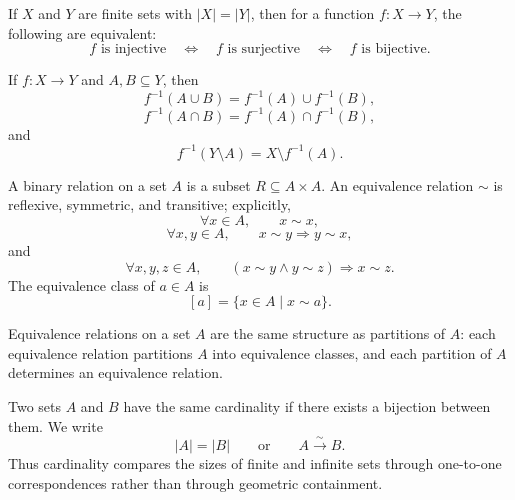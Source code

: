     \begin{proposition}
        If $X$ and $Y$ are finite sets with $|X|=|Y|$, then for a function
        $f:X\to Y$, the following are equivalent:
        \[
            f\text{ is injective}
            \quad\Longleftrightarrow\quad
            f\text{ is surjective}
            \quad\Longleftrightarrow\quad
            f\text{ is bijective}.
        \]
    \end{proposition}

    \begin{proposition}
        If $f:X\to Y$ and $A,B\subseteq Y$, then
        \[
            f^{-1}(A\cup B)=f^{-1}(A)\cup f^{-1}(B),
        \]
        \[
            f^{-1}(A\cap B)=f^{-1}(A)\cap f^{-1}(B),
        \]
        and
        \[
            f^{-1}(Y\setminus A)=X\setminus f^{-1}(A).
        \]
    \end{proposition}

    \begin{definition}
        A binary relation on a set $A$ is a subset $R\subseteq A\times A$.
        An equivalence relation $\sim$ is reflexive, symmetric, and transitive;
        explicitly,
        \[
            \forall x\in A,
            \qquad x\sim x,
        \]
        \[
            \forall x,y\in A,
            \qquad x\sim y\Rightarrow y\sim x,
        \]
        and
        \[
            \forall x,y,z\in A,
            \qquad
            (x\sim y\land y\sim z)\Rightarrow x\sim z.
        \]
        The equivalence class of $a\in A$ is
        \[
            [a]=\{x\in A\mid x\sim a\}.
        \]
    \end{definition}

    \begin{proposition}
        Equivalence relations on a set $A$ are the same structure as partitions
        of $A$: each equivalence relation partitions $A$ into equivalence
        classes, and each partition of $A$ determines an equivalence relation.
    \end{proposition}

    \begin{definition}
        Two sets $A$ and $B$ have the same cardinality if there exists a
        bijection between them. We write
        \[
            |A|=|B|
            \qquad\text{or}\qquad
            A\xrightarrow{\sim}B.
        \]
        Thus cardinality compares the sizes of finite and infinite sets through
        one-to-one correspondences rather than through geometric containment.
    \end{definition}

